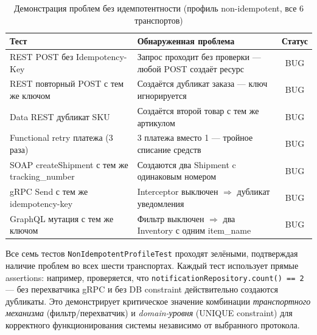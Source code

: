 \begin{table}[H]
\centering
\caption{Демонстрация проблем без идемпотентности (профиль non-idempotent, все 6 транспортов)}
\label{tab:results-non-idempotent}
\small
\begin{tabularx}{\textwidth}{@{}X X c@{}}
\toprule
\textbf{Тест} & \textbf{Обнаруженная проблема} & \textbf{Статус} \\
\midrule
REST POST без Idempotency-Key       & Запрос проходит без проверки --- любой POST создаёт ресурс         & BUG \\
REST повторный POST с тем же ключом & Создаётся дубликат заказа --- ключ игнорируется                    & BUG \\
Data REST дубликат SKU              & Создаётся второй товар с тем же артикулом                          & BUG \\
Functional retry платежа (3 раза)   & 3 платежа вместо 1 --- тройное списание средств                    & BUG \\
SOAP createShipment с тем же tracking\_number & Создаются два Shipment c одинаковым номером                & BUG \\
gRPC Send с тем же idempotency-key  & Interceptor выключен $\Rightarrow$ дубликат уведомления            & BUG \\
GraphQL мутация с тем же ключом     & Фильтр выключен $\Rightarrow$ два Inventory с одним item\_name     & BUG \\
\bottomrule
\end{tabularx}
\end{table}

Все семь тестов \texttt{NonIdempotentProfileTest} проходят зелёными, подтверждая наличие проблем во всех шести транспортах. Каждый тест использует прямые assertions: например, проверяется, что \mbox{\texttt{notificationRepository.count() == 2}} --- без перехватчика gRPC и без DB constraint действительно создаются дубликаты. Это демонстрирует критическое значение комбинации \emph{транспортного механизма} (фильтр/перехватчик) и \emph{domain-уровня} (UNIQUE constraint) для корректного функционирования системы независимо от выбранного протокола.
